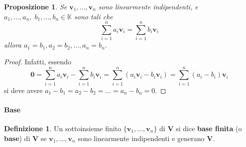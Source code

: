 \documentclass{article}
\theoremstyle{plain}
\newtheorem{prop}[thm]{Proposizione}
\theoremstyle{definition}
\newtheorem{defn}{Definizione}[section]
\theoremstyle{remark}
\begin{document}
\vspace{10pt}

\begin{bxthm}
\begin{prop}\label{prop:quattrodieci}
    Se \( \mathbf{v}_1, \ldots, \mathbf{v}_n \) sono linearmente indipendenti, e 
    \( a_1, \ldots, a_n,\; b_1, \ldots, b_n \in\mathbb{K}\) sono tali che
    \[ \sum_{i=1}^{n}a_i\mathbf{v}_i = \sum_{i=1}^{n}b_i\mathbf{v}_i \]
    allora \( a_1 = b_1, a_2 = b_2, \ldots, a_n = b_n \).
\end{prop}
\end{bxthm}
\begin{proof}
    Infatti, essendo
    \[ \mathbf{0} = \sum_{i=1}^{n}a_i\mathbf{v}_i - \sum_{i=1}^{n}b_i\mathbf{v}_i = \sum_{i=1}^{n}(a_i\mathbf{v}_i - b_i\mathbf{v}_i) = \sum_{i=1}^{n}(a_i-b_i)\mathbf{v}_i\]
    si deve avere \( a_1 - b_1 = a_2 - b_2 = \ldots = a_n - b_n = 0 \).
\end{proof}

\vspace{10pt}

\paragraph{Base}
\begin{bxthm}
\begin{defn}
    Un sottoinsieme finito \( \{\mathbf{v}_1, \ldots, \mathbf{v}_n\} \) di \( \mathbf{V} \) si dice \textbf{base finita} (o \textbf{base}) di \( \mathbf{V} \) se \( \mathbf{v}_1, \ldots, \mathbf{v}_n \) sono linearmente indipendenti e generano \( \mathbf{V} \).
\end{defn}
\end{bxthm}

\vspace{10pt}
\end{document}

